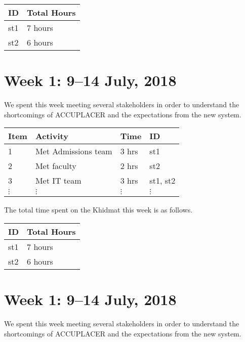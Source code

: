 \documentclass{article}
\begin{document}
\begin{tabular}{|l|l|}
  \hline
  ID & Total Hours\\\hline\hline
  st1 & 7 hours\\\hline
  st2 & 6 hours\\\hline
\end{tabular}


\newpage %
\section*{Week 1: 9--14 July, 2018}

We spent this week meeting several stakeholders in order to understand the shortcomings of ACCUPLACER and the expectations from the new system.

\begin{tabular}{|l|l|l|l|}
  \hline
  Item  & Activity & Time & ID \\\hline\hline
  1 & Met Admissions team & 3 hrs & st1 \\\hline
  2 & Met faculty & 2 hrs & st2 \\\hline
  3 & Met IT team & 3 hrs & st1, st2 \\\hline
  $\vdots$ & $\vdots$ & $\vdots$ & $\vdots$ \\\hline
\end{tabular}

The total time spent on the Khidmat this week is as follows.

\begin{tabular}{|l|l|}
  \hline
  ID & Total Hours\\\hline\hline
  st1 & 7 hours\\\hline
  st2 & 6 hours\\\hline
\end{tabular}


\newpage %
\section*{Week 1: 9--14 July, 2018}

We spent this week meeting several stakeholders in order to understand the shortcomings of ACCUPLACER and the expectations from the new system.
\end{document}
